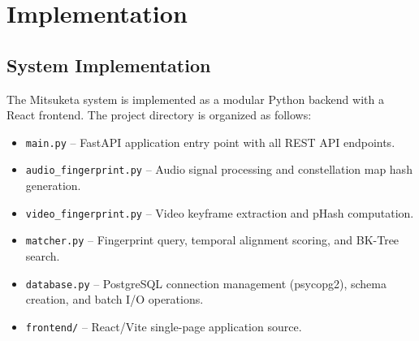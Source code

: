 \newpage
\chapter{Implementation}

\section{System Implementation}
The Mitsuketa system is implemented as a modular Python backend with a React frontend. The project directory is organized as follows:
\begin{itemize}
  \item \texttt{main.py} -- FastAPI application entry point with all REST API endpoints.
  \item \texttt{audio\_fingerprint.py} -- Audio signal processing and constellation map hash generation.
  \item \texttt{video\_fingerprint.py} -- Video keyframe extraction and pHash computation.
  \item \texttt{matcher.py} -- Fingerprint query, temporal alignment scoring, and BK-Tree search.
  \item \texttt{database.py} -- PostgreSQL connection management (psycopg2), schema creation, and batch I/O operations.
  \item \texttt{frontend/} -- React/Vite single-page application source.
\end{itemize}

